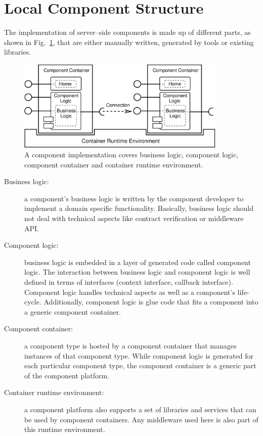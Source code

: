 \section{Local Component Structure}
\label{LocalComponentStructure}

The implementation of server--side components is made up of different parts,
as shown in Fig.~\ref{ContainerComponentlogicBusinesslogic}, that are either
manually written, generated by tools or existing libraries.

\begin{figure}[htbp]
    \begin{center}
    \includegraphics [width=10cm,angle=0] 
		     {ComponentModel/figures/ContainerComponentlogicBusinesslogic}
    \caption{A component implementation covers business logic, component
    logic, component container and container runtime environment.}
    \label{ContainerComponentlogicBusinesslogic}            
    \end{center}
\end{figure}

\begin{description}
\item [Business logic:]
  a component's business logic is written by the component developer to 
  implement   a domain specific functionality.
  Basically, business logic should not deal with technical aspects like contract
  verification or middleware API.
  
\item [Component logic:]
  business logic is embedded in a layer of generated code called component 
  logic. The interaction between business logic and component logic is well 
  defined in terms of interfaces (context interface, callback interface).
  Component logic handles technical aspects as well as a component's life-cycle.
  Additionally, component logic is glue code that fits a component into a 
  generic component container.
  
\item [Component container:]
  a component type is hosted by a component container that manages instances of
  that component type.
  While component logic is generated for each particular component type, the 
  component container is a generic part of the component platform.
  
\item [Container runtime environment:]
  a component platform also supports a set of libraries and services that can 
  be used by component containers.
  Any middleware used here is also part of this runtime environment.
\end{description}


